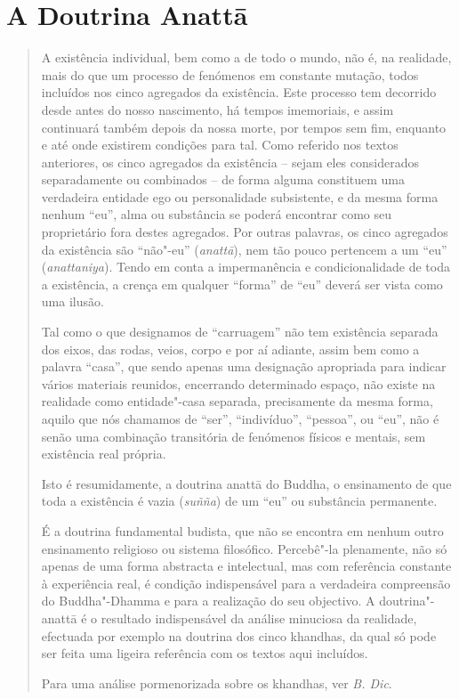 
\section{A Doutrina Anattā}

\begin{quote}
  A existência individual, bem como a de todo o mundo, não é, na realidade, mais
  do que um processo de fenómenos em constante mutação, todos incluídos nos
  cinco agregados da existência. Este processo tem decorrido desde antes do
  nosso nascimento, há tempos imemoriais, e assim continuará também depois da
  nossa morte, por tempos sem fim, enquanto e até onde existirem condições para
  tal. Como referido nos textos anteriores, os cinco agregados da existência --
  sejam eles considerados separadamente ou combinados -- de forma alguma
  constituem uma verdadeira entidade ego ou personalidade subsistente, e da
  mesma forma nenhum “eu”, alma ou substância se poderá encontrar como seu
  proprietário fora destes agregados. Por outras palavras, os cinco agregados da
  existência são “não"-eu” (\emph{anattā}), nem tão pouco pertencem a um “eu”
  (\emph{anattaniya}). Tendo em conta a impermanência e condicionalidade de toda
  a existência, a crença em qualquer “forma” de “eu” deverá ser vista como
  uma ilusão.

  Tal como o que designamos de “carruagem” não tem existência separada dos
  eixos, das rodas, veios, corpo e por aí adiante, assim bem como a palavra
  “casa”, que sendo apenas uma designação apropriada para indicar vários
  materiais reunidos, encerrando determinado espaço, não existe na realidade
  como entidade"-casa separada, precisamente da mesma forma, aquilo que nós
  chamamos de “ser”, “indivíduo”, “pessoa”, ou “eu”, não é senão uma
  combinação transitória de fenómenos físicos e mentais, sem existência real
  própria.

  Isto é resumidamente, a doutrina anattā do Buddha, o ensinamento de que toda a
  existência é vazia (\emph{suñña}) de um “eu” ou substância permanente.

  É a doutrina fundamental budista, que não se encontra em nenhum outro
  ensinamento religioso ou sistema filosófico. Percebê"-la plenamente, não só
  apenas de uma forma abstracta e intelectual, mas com referência constante à
  experiência real, é condição indispensável para a verdadeira compreensão do
  Buddha"-Dhamma e para a realização do seu objectivo. A doutrina"-anattā é o
  resultado indispensável da análise minuciosa da realidade, efectuada por
  exemplo na doutrina dos cinco khandhas, da qual só pode ser feita uma ligeira
  referência com os textos aqui incluídos.

  Para uma análise pormenorizada sobre os khandhas, ver \emph{B. Dic}.
\end{quote}

